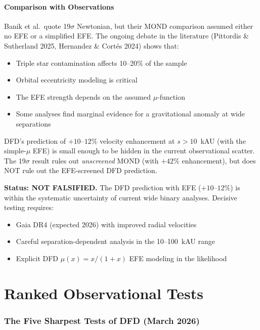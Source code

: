 \documentclass[11pt,a4paper]{article}
\begin{document}
\subsection{Comparison with Observations}

Banik et al.\ quote 19$\sigma$ Newtonian, but their MOND comparison
assumed either no EFE or a simplified EFE. The ongoing debate in the
literature (Pittordis \& Sutherland 2025, Hernandez \& Cort\'es 2024)
shows that:

\begin{itemize}[nosep]
\item Triple star contamination affects 10--20\% of the sample
\item Orbital eccentricity modeling is critical
\item The EFE strength depends on the assumed $\mu$-function
\item Some analyses find marginal evidence for a gravitational anomaly
  at wide separations
\end{itemize}

DFD's prediction of $+10$--$12\%$ velocity enhancement at $s > 10$~kAU
(with the simple-$\mu$ EFE) is small enough to be hidden in the current
observational scatter. The 19$\sigma$ result rules out \emph{unscreened}
MOND (with $+42\%$ enhancement), but does NOT rule out the EFE-screened
DFD prediction.

\textbf{Status: NOT FALSIFIED.} The DFD prediction with EFE ($+10$--$12\%$)
is within the systematic uncertainty of current wide binary analyses.
Decisive testing requires:
\begin{itemize}[nosep]
\item Gaia DR4 (expected 2026) with improved radial velocities
\item Careful separation-dependent analysis in the 10--100~kAU range
\item Explicit DFD $\mu(x) = x/(1+x)$ EFE modeling in the likelihood
\end{itemize}


\part{Ranked Observational Tests}
\label{part:ranked}

\section{The Five Sharpest Tests of DFD (March 2026)}
\end{document}
